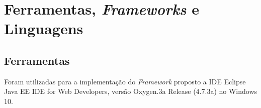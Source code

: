 \chapter{Ferramentas, \textit{Frameworks} e Linguagens}
\label{cap:cap0}
\section{Ferramentas}
Foram utilizadas para a implementação do \textit{Framework} proposto a IDE Eclipse Java EE IDE for Web Developers, versão Oxygen.3a Release (4.7.3a) no Windows 10.


